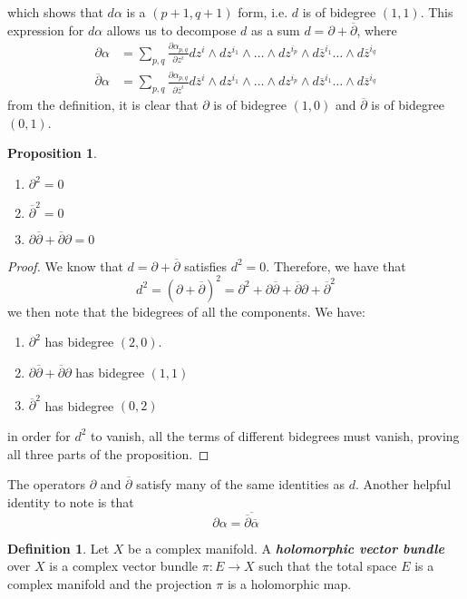 \documentclass[psamsfonts, 12pt]{amsart}
\newtheorem{prop}[thm]{Proposition}
\theoremstyle{definition}
\newtheorem{defn}[thm]{Definition}
\theoremstyle{remark}
\newcommand{\ib}[1]{\textbf{\textit{#1}}}
\newcommand{\dbar}{\overline{\partial}}
\newcommand{\enumbreak}{\ \\ \vspace{-\baselineskip}}
\begin{document}
%
which shows that $d\alpha$ is a $(p+1,q+1)$ form, i.e. $d$ is of bidegree $(1,1)$. This
expression for $d\alpha$ allows us to decompose $d$ as a sum $d = \partial + \dbar$,
where
%
\begin{align*}
\partial\alpha &= \sum_{p,q}\frac{\partial\alpha_{p,q}}{\partial z^i} dz^i
\wedge dz^{i_1} \wedge \ldots \wedge dz^{i_p} \wedge
d\overline{z}^{i_1}\ldots \wedge d\overline{z}^{i_q} \\[5pt]
\dbar\alpha &= \sum_{p,q}\frac{\partial\alpha_{p,q}}{\partial \overline{z}^i}
d\overline{z}^i \wedge dz^{i_1} \wedge \ldots \wedge dz^{i_p} \wedge
d\overline{z}^{i_1}\ldots \wedge d\overline{z}^{i_q}
\end{align*}
%
from the definition, it is clear that $\partial$ is of bidegree $(1,0)$ and $\dbar$ is
of bidegree $(0,1)$.
%
\begin{prop}\enumbreak
\begin{enumerate}
  \item $\partial^2 = 0$
  \item $\dbar^2 = 0$
  \item $\partial\dbar + \dbar\partial = 0$
\end{enumerate}
\end{prop}
%
\begin{proof}
We know that $d = \partial + \dbar$ satisfies $d^2 = 0$. Therefore, we have that
\[
d^2 = (\partial +\dbar)^2 = \partial^2 + \partial\dbar + \dbar\partial + \dbar^2
\]
we then note that the bidegrees of all the components. We have:
\begin{enumerate}
  \item $\partial^2$ has bidegree $(2,0)$.
  \item $\partial\dbar + \dbar\partial$ has bidegree $(1,1)$
  \item $\dbar^2$ has bidegree $(0,2)$
\end{enumerate}
in order for $d^2$ to vanish, all the terms of different bidegrees must vanish, proving
all three parts of the proposition.
\end{proof}
%
The operators $\partial$ and $\dbar$ satisfy many of the same identities as $d$. Another
helpful identity to note is that
\[
\partial\alpha = \overline{\dbar\overline{\alpha}}
\]
\begin{defn}
Let $X$ be a complex manifold. A \ib{holomorphic vector bundle} over $X$ is a
complex vector bundle $\pi : E \to X$ such that the total space $E$ is a complex
manifold
and the projection $\pi$ is a holomorphic map.
\end{defn}
\end{document}
